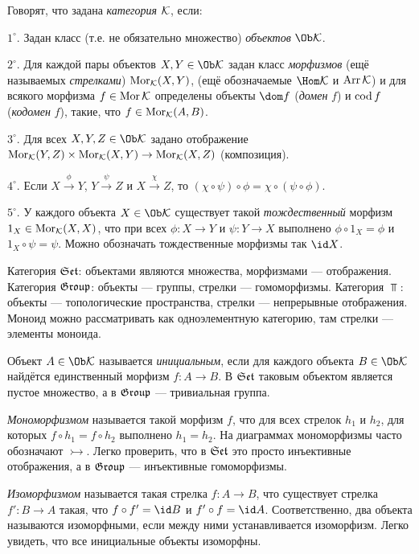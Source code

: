 \documentclass[10pt,a4paper]{article}
\begin{document}
Говорят, что задана \emph{категория} $\mathcal{K}$, если:
\par $1^\circ$. Задан класс (т.е. не обязательно множество)
{\em объектов} $\Ob\Ck$.
\par $2^\circ$. Для каждой пары объектов $X,Y\in\Ob\Ck$ задан
класс {\em морфизмов} (ещё называемых {\em
стрелками}) $\operatorname{Mor}_{\mathcal{K}}(X,Y)$, (ещё обозначаемые
$\Hom\Ck$ и $\operatorname{Arr}\mathcal{K}$) и для всякого морфизма $f\in\operatorname{Mor}\mathcal{K}$
определены объекты $\dom f$ ({\em домен} $f$) и $\operatorname{cod}
f$ ({\em кодомен} $f$), такие, что
$f\in\operatorname{Mor}_{\mathcal{K}}(A,B)$.
\par $3^\circ$. Для всех $X,Y,Z\in\Ob\Ck$ задано отображение $\operatorname{Mor}_{\mathcal{K}}(Y,Z)
\times\operatorname{Mor}_{\mathcal{K}}(X,Y)\rightarrow\operatorname{Mor}_{\mathcal{K}}(X,Z)$ (композиция).
\par $4^\circ$. Если $X\stackrel{\phi}\to Y$,
$Y\stackrel{\psi}\to Z$ и $X\stackrel{\chi}\to Z$, то
$(\chi\circ\psi)\circ\phi=\chi\circ(\psi\circ\phi)$.
\par $5^\circ$. У каждого объекта $X\in\Ob\Ck$ существует такой
{\em тождественный} морфизм
$1_X\in\operatorname{Mor}_{\mathcal{K}}(X,X)$, что при всех $\phi:X\to Y$ и $\psi:Y\to
X$ выполнено $\phi\circ 1_X=\phi$ и $1_X\circ\psi=\psi$. Можно
обозначать тождественные морфизмы так $\id X$.

\begin{ex}
Категория $\mathfrak{Set}$: объектами являются
множества, морфизмами
--- отображения. Категория $\mathfrak{Group}$: объекты --- группы, стрелки
--- гомоморфизмы. Категория $\Top$: объекты --- топологические
пространства, стрелки --- непрерывные отображения. Моноид можно
рассматривать как одноэлементную категорию, там стрелки ---
элементы моноида.
\end{ex}

Объект $A\in\Ob\Ck$ называется {\em
инициальным}, если для каждого объекта
$B\in\Ob\Ck$ найдётся единственный морфизм $f:A\to B$. В $\mathfrak{Set}$
таковым объектом является пустое множество, а в $\mathfrak{Group}$
--- тривиальная группа.

{\em Мономорфизмом} называется такой морфизм
$f$, что для всех стрелок $h_1$ и $h_2$, для которых $f\circ
h_1=f\circ h_2$ выполнено $h_1=h_2$. На диаграммах мономорфизмы
часто обозначают $\rightarrowtail$. Легко проверить, что в $\mathfrak{Set}$
это просто инъективные отображения, а в $\mathfrak{Group}$ --- инъективные
гомоморфизмы.

{\em Изоморфизмом} называется такая стрелка
$f:A\to B$, что существует стрелка $f':B\to A$ такая, что $f\circ
f'=\id B$ и $f'\circ f=\id A$. Соответственно, два объекта
называются изоморфными, если между ними устанавливается
изоморфизм. Легко увидеть, что все инициальные объекты изоморфны.
\end{document}

